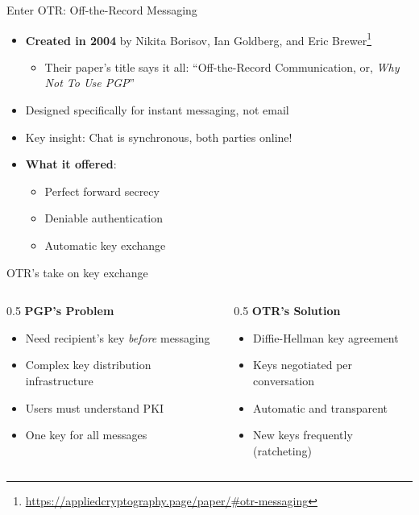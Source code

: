 \ifdefined\PRESENTATION\else\PassOptionsToClass{handout}{beamer}\fi\documentclass[aspectratio=169, lualatex]{beamer}
\begin{document}
\begin{frame}{Enter OTR: Off-the-Record Messaging}
	\begin{itemize}
		\item \textbf{Created in 2004} by Nikita Borisov, Ian Goldberg, and Eric Brewer\footnote{\url{https://appliedcryptography.page/paper/\#otr-messaging}}
		      \begin{itemize}
			      \item Their paper's title says it all: ``Off-the-Record Communication, or, \textit{Why Not To Use PGP}''
		      \end{itemize}
		\item Designed specifically for instant messaging, not email
		\item Key insight: Chat is synchronous, both parties online!
		\item \textbf{What it offered}:
		      \begin{itemize}
			      \item Perfect forward secrecy
			      \item Deniable authentication
			      \item Automatic key exchange
		      \end{itemize}
	\end{itemize}
\end{frame}

\begin{frame}{OTR's take on key exchange}
	\begin{columns}
		\begin{column}{0.5\textwidth}
			\textbf{PGP's Problem}
			\begin{itemize}
				\item Need recipient's key \textit{before} messaging
				\item Complex key distribution infrastructure
				\item Users must understand PKI
				\item One key for all messages
			\end{itemize}
		\end{column}
		\begin{column}{0.5\textwidth}
			\textbf{OTR's Solution}
			\begin{itemize}
				\item Diffie-Hellman key agreement
				\item Keys negotiated per conversation
				\item Automatic and transparent
				\item New keys frequently (ratcheting)
			\end{itemize}
		\end{column}
	\end{columns}
\end{frame}
\end{document}
